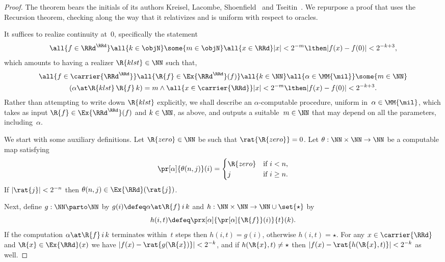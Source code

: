\begin{proof}
  The theorem bears the initials of its authors Kreisel, Lacombe, Shoenfield~\cite{KreiselLacombeShoenfield59} and Tseitin~\cite{Tseitin67}. We repurpose a proof that uses the Recursion theorem, checking along the way that it relativizes and is uniform with respect to oracles.

  It suffices to realize continuity at~$0$, specifically the statement
  \begin{equation*}
    \all{f \in \RRd^{\RRd}}
    \all{k \in \objN}
    \some{m \in \objN}
    \all{x \in \RRd}
    |x| < 2^{-m} \lthen |f(x) - f(0)| < 2^{-k + 3},
  \end{equation*}
  which amounts to having a realizer $\R{klst} \in \NN$ such that,
  \begin{multline*}
    \all{f \in \carrier{\RRd^{\RRd}}}
    \all{\R{f} \in \Ex{\RRd^{\RRd}}(f)}
    \all{k \in \NN}
    \all{\alpha \in \MM{\mil}}
    \some{m \in \NN} \\
    (\alpha \at \R{klst} \, \R{f} \, k) = m
    \land
    \all{x \in \carrier{\RRd}}
    |x| < 2^{-m} \lthen |f(x) - f(0)| < 2^{-k + 3}.
  \end{multline*}
  Rather than attempting to write down $\R{klst}$ explicitly, we shall describe an $\alpha$-computable procedure, uniform in~$\alpha \in \MM{\mil}$, which takes as input $\R{f} \in \Ex{\RRd^\RRd}(f)$ and $k \in \NN$, as above, and outputs a suitable~$m \in \NN$ that may depend on all the parameters, including~$\alpha$.

  We start with some auxiliary definitions.
  Let $\R{zero} \in \NN$ be such that $\rat{\R{zero}} = 0$.
  Let $\theta : \NN \times \NN \to \NN$ be a computable map satisfying
  \begin{equation*}
    \pr[\alpha]{\theta(n, j)}(i) =
    \begin{cases}
      \R{zero} &\text{if $i < n$,} \\
      j       &\text{if $i \geq n$.}
    \end{cases}
  \end{equation*}
  If $|\rat{j}| < 2^{-n}$ then $\theta(n, j) \in \Ex{\RRd}(\rat{j})$.

  Next, define $g : \NN \parto \NN$ by $g(i) \defeq \alpha \at \R{f} \, i \, k$ and
  $h : \NN \times \NN \to \NN \cup \set{\star}$ by
  \begin{equation*}
    h(i, t) \defeq \prx[\alpha]{\pr[\alpha]{\R{f}}(i)}{t}(k).
  \end{equation*}
  If the computation $\alpha \at \R{f} \, i \, k$ terminates within~$t$ steps then $h(i, t) = g(i)$, otherwise $h(i, t) = \star$. For any $x \in \carrier{\RRd}$ and $\R{x} \in \Ex{\RRd}(x)$ we have $|f(x) - \rat{g(\R{x})}| < 2^{-k}$, and if $h(\R{x}, t) \neq \star$ then $|f(x) - \rat{h(\R{x}, t)}| < 2^{-k}$ as well.


\end{proof}
